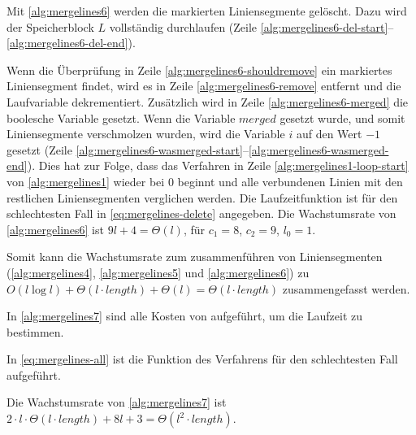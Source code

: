 Mit \autoref{alg:mergelines6} werden die markierten Liniensegmente gelöscht. Dazu wird der Speicherblock $L$
 vollständig durchlaufen (Zeile \ref{alg:mergelines6-del-start}--\ref{alg:mergelines6-del-end}).

Wenn die Überprüfung in Zeile \ref{alg:mergelines6-shouldremove} ein markiertes Liniensegment findet, wird es in Zeile
 \ref{alg:mergelines6-remove} entfernt und die Laufvariable dekrementiert. Zusätzlich wird in Zeile
 \ref{alg:mergelines6-merged} die boolesche Variable gesetzt. Wenn die Variable $\mathit{merged}$ gesetzt wurde, und
 somit Liniensegmente verschmolzen wurden, wird die Variable $i$ auf den Wert $-1$ gesetzt
 (Zeile \ref{alg:mergelines6-wasmerged-start}--\ref{alg:mergelines6-wasmerged-end}). Dies hat zur Folge, dass das
 Verfahren  in Zeile \ref{alg:mergelines1-loop-start} von \autoref{alg:mergelines1} wieder bei $0$
 beginnt und alle verbundenen Linien mit den restlichen Liniensegmenten verglichen werden. Die Laufzeitfunktion ist für
 den schlechtesten Fall in \autoref{eq:mergelines-delete} angegeben. Die Wachstumsrate von \autoref{alg:mergelines6}
 ist $9l + 4 = \Theta(l)$, für $c_{1} = 8$, $c_{2} = 9$, $l_{0} = 1$.

Somit kann die Wachstumsrate zum zusammenführen von Liniensegmenten (\autoref{alg:mergelines4},
 \autoref{alg:mergelines5} und \autoref{alg:mergelines6}) zu
 $O(l \log l) + \Theta(l\cdot\mathit{length}) + \Theta(l) = \Theta(l\cdot\mathit{length})$ zusammengefasst werden.

In \autoref{alg:mergelines7} sind alle Kosten von  aufgeführt, um die Laufzeit zu bestimmen.

In \autoref{eq:mergelines-all} ist die Funktion des Verfahrens für den schlechtesten Fall aufgeführt.

Die Wachstumsrate von \autoref{alg:mergelines7} ist
 $2 \cdot l \cdot \Theta(l \cdot \mathit{length}) + 8l + 3 = \Theta(l^2 \cdot \mathit{length})$.

